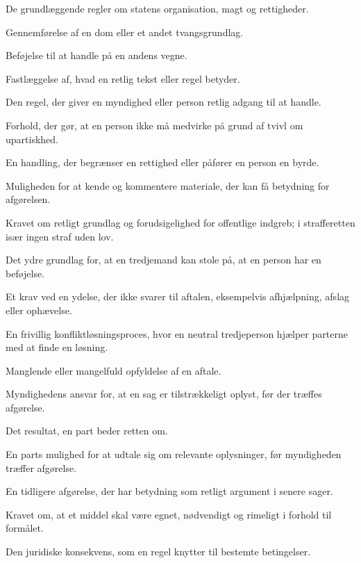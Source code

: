 \begin{description}[style=nextline,leftmargin=0pt,labelindent=0pt]
  \item[Forfatning] De grundlæggende regler om statens organisation, magt og rettigheder.
  \item[Fuldbyrdelse] Gennemførelse af en dom eller et andet tvangsgrundlag.
  \item[Fuldmagt] Beføjelse til at handle på en andens vegne.
  \item[Fortolkning] Fastlæggelse af, hvad en retlig tekst eller regel betyder.
  \item[Hjemmel] Den regel, der giver en myndighed eller person retlig adgang til at handle.
  \item[Inhabilitet] Forhold, der gør, at en person ikke må medvirke på grund af tvivl om upartiskhed.
  \item[Indgreb] En handling, der begrænser en rettighed eller påfører en person en byrde.
  \item[Kontradiktion] Muligheden for at kende og kommentere materiale, der kan få betydning for afgørelsen.
  \item[Legalitetsprincip] Kravet om retligt grundlag og forudsigelighed for offentlige indgreb; i strafferetten især ingen straf uden lov.
  \item[Legitimation] Det ydre grundlag for, at en tredjemand kan stole på, at en person har en beføjelse.
  \item[Mangelsbeføjelse] Et krav ved en ydelse, der ikke svarer til aftalen, eksempelvis afhjælpning, afslag eller ophævelse.
  \item[Mediation] En frivillig konfliktløsningsproces, hvor en neutral tredjeperson hjælper parterne med at finde en løsning.
  \item[Misligholdelse] Manglende eller mangelfuld opfyldelse af en aftale.
  \item[Officialprincippet] Myndighedens ansvar for, at en sag er tilstrækkeligt oplyst, før der træffes afgørelse.
  \item[Påstand] Det resultat, en part beder retten om.
  \item[Partshøring] En parts mulighed for at udtale sig om relevante oplysninger, før myndigheden træffer afgørelse.
  \item[Præcedens] En tidligere afgørelse, der har betydning som retligt argument i senere sager.
  \item[Proportionalitet] Kravet om, at et middel skal være egnet, nødvendigt og rimeligt i forhold til formålet.
  \item[Retsfølge] Den juridiske konsekvens, som en regel knytter til bestemte betingelser.

\end{description}
